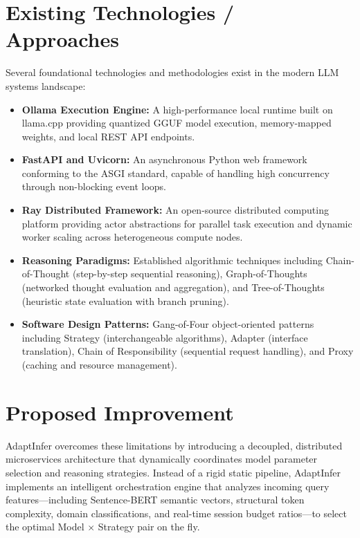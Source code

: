 \documentclass[12pt,a4paper]{report}
\begin{document}
\section{Existing Technologies / Approaches}
\label{sec:existing_technologies}
Several foundational technologies and methodologies exist in the modern LLM systems landscape:
\begin{itemize}[leftmargin=*]
    \item \textbf{Ollama Execution Engine:} A high-performance local runtime built on llama.cpp providing quantized GGUF model execution, memory-mapped weights, and local REST API endpoints.
    \item \textbf{FastAPI and Uvicorn:} An asynchronous Python web framework conforming to the ASGI standard, capable of handling high concurrency through non-blocking event loops.
    \item \textbf{Ray Distributed Framework:} An open-source distributed computing platform providing actor abstractions for parallel task execution and dynamic worker scaling across heterogeneous compute nodes.
    \item \textbf{Reasoning Paradigms:} Established algorithmic techniques including Chain-of-Thought (step-by-step sequential reasoning), Graph-of-Thoughts (networked thought evaluation and aggregation), and Tree-of-Thoughts (heuristic state evaluation with branch pruning).
    \item \textbf{Software Design Patterns:} Gang-of-Four object-oriented patterns including Strategy (interchangeable algorithms), Adapter (interface translation), Chain of Responsibility (sequential request handling), and Proxy (caching and resource management).
\end{itemize}

\section{Proposed Improvement}
\label{sec:proposed_improvement}
AdaptInfer overcomes these limitations by introducing a decoupled, distributed microservices architecture that dynamically coordinates model parameter selection and reasoning strategies. Instead of a rigid static pipeline, AdaptInfer implements an intelligent orchestration engine that analyzes incoming query features—including Sentence-BERT semantic vectors, structural token complexity, domain classifications, and real-time session budget ratios—to select the optimal Model $\times$ Strategy pair on the fly.
\end{document}

